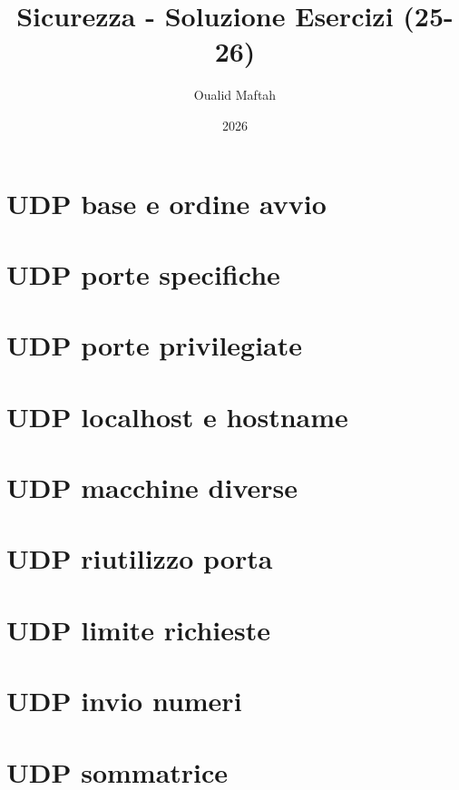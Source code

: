 \documentclass[11pt]{article}
\title{Sicurezza - Soluzione Esercizi (25-26)}
\author{Oualid Maftah}
\date{2026}
\begin{document}
\maketitle
\tableofcontents
\newpage

\section{UDP base e ordine avvio}

\newpage

\section{UDP porte specifiche}

\newpage

\section{UDP porte privilegiate}

\newpage

\section{UDP localhost e hostname}

\newpage

\section{UDP macchine diverse}

\newpage

\section{UDP riutilizzo porta}

\newpage

\section{UDP limite richieste}

\newpage

\section{UDP invio numeri}

\newpage

\section{UDP sommatrice}

\newpage
\end{document}

